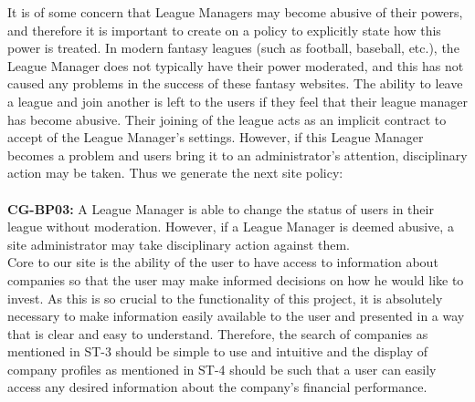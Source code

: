 It is of some concern that League Managers may become abusive of their powers, and
therefore it is important to create on a policy to explicitly state how this power
is treated. In modern fantasy leagues (such as football, baseball, etc.), the
League Manager does not typically have their power moderated, and this has not caused
any problems in the success of these fantasy websites. The ability to leave a league
and join another is left to the users if they feel that their league manager has become
abusive. Their joining of the league acts as an implicit contract to accept of the
League Manager's settings. However, if this League Manager becomes a problem and users
bring it to an administrator's attention, disciplinary action may be taken. Thus we
generate the next site policy:\\ \\

\textbf{CG-BP03:} A League Manager is able to change the status of users in their league
without moderation. However, if a League Manager is deemed abusive, a site administrator
may take disciplinary action against them. \\

Core to our site is the ability of the user to have access to information about companies
so that the user may make informed decisions on how he would like to invest. As this is so
crucial to the functionality of this project, it is absolutely necessary to make
information easily available to the user and presented in a way that is clear and easy to
understand. Therefore, the search of companies as mentioned in ST-3 should be simple to use
and intuitive and the display of company profiles as mentioned in ST-4 should be such that
a user can easily access any desired information about the company's financial performance. \\

